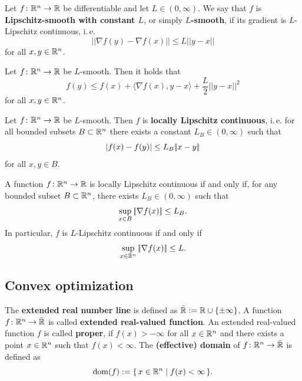 \begin{definition}
    Let $f\colon \mathbb{R}^n \to \mathbb{R}$ be differentiable and let $L \in (0,\infty)$. We say that $f$ is
    \textbf{Lipschitz-smooth with constant $L$}, or simply \textbf{$L$-smooth},
    if its gradient is $L$-Lipschitz continuous, i.\,e.
    \[
        |\!|\nabla f(y) - \nabla f(x)|\!| \leq L|\!|y - x|\!|
    \]
    for all $x,y\in\mathbb{R}^n$.
\end{definition}

\begin{proposition}
    \label{prop:lipschitz-gradients}
    Let $f\colon \mathbb{R}^n \to \mathbb{R}$ be $L$-smooth. Then it holds that
    \[
        f(y) \leq f(x) + \langle \nabla f(x), y-x \rangle + \frac{L}{2} |\!|y-x|\!|^2
    \]
    for all $x, y\in\mathbb{R}^n$.
\end{proposition}

\begin{proposition}
    \label{prop:smoothness-implies-local-lipschitz}
    Let $f\colon \mathbb{R}^n \to \mathbb{R}$ be $L$-smooth. Then $f$ is \textbf{locally Lipschitz continuous}, i.\,e.
    for all bounded subsets $B\subset\mathbb{R}^n$ there exists a constant $L_B\in(0,\infty)$ such that
    \[
        |f(x) - f(y)| \leq L_B |\!|x - y|\!|
    \]
    for all $x,y\in B$.
\end{proposition}

\begin{proposition}
    \label{prop:local-lipschitz-iff-bounded-gradient-norm}
    A function $f\colon \mathbb{R}^n \to \mathbb{R}$ is locally Lipschitz continuous
    if and only if, for any bounded subset $B\subset\mathbb{R}^n$, there exists $L_B\in(0,\infty)$ such that
    \[
        \sup_{x\in B} |\!|\nabla f(x)|\!| \leq L_B.
    \]
    In particular, $f$ is $L$-Lipschitz continuous if and only if
    \[
        \sup_{x\in\mathbb{R}^n} |\!|\nabla f(x)|\!| \leq L.
    \]
\end{proposition}

\subsection{Convex optimization}

\begin{definition}
    The \textbf{extended real number line} is defined as $\bar{\mathbb{R}} := \mathbb{R} \cup \{ \pm \infty \}$. 
    A function $f\colon\mathbb{R}^n\to\bar{\mathbb{R}}$ is called \textbf{extended real-valued function}.
    An extended real-valued function $f$ is called \textbf{proper},
    if $f(x) > -\infty$ for all $x\in\mathbb{R}^n$ and there exists a point $x\in\mathbb{R}^n$ such that $f(x) < \infty$.
    The \textbf{(effective) domain} of $f\colon\mathbb{R}^n\to\bar{\mathbb{R}}$ is defined as
    \[
        \operatorname{dom}(f) := \{\, x\in\mathbb{R}^n \mid f(x) < \infty \,\}.
    \]
\end{definition}

